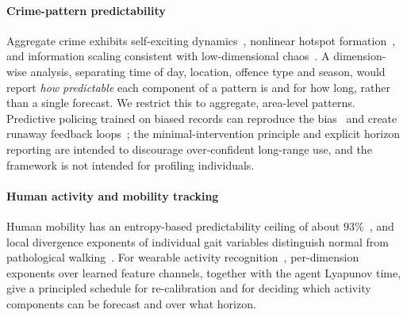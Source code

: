 \documentclass[preprint,12pt]{elsarticle}
\begin{document}
\paragraph{Crime-pattern predictability}
Aggregate crime exhibits self-exciting dynamics~\cite{mohler2011}, nonlinear hotspot formation~\cite{short2008}, and information scaling consistent with low-dimensional chaos~\cite{melgarejo2018}. A dimension-wise analysis, separating time of day, location, offence type and season, would report \emph{how predictable} each component of a pattern is and for how long, rather than a single forecast. We restrict this to aggregate, area-level patterns. Predictive policing trained on biased records can reproduce the bias~\cite{lum2016} and create runaway feedback loops~\cite{ensign2018}; the minimal-intervention principle and explicit horizon reporting are intended to discourage over-confident long-range use, and the framework is not intended for profiling individuals.

\paragraph{Human activity and mobility tracking}
Human mobility has an entropy-based predictability ceiling of about $93\%$~\cite{song2010}, and local divergence exponents of individual gait variables distinguish normal from pathological walking~\cite{dingwell2000,bruijn2013}. For wearable activity recognition~\cite{wang2019har}, per-dimension exponents over learned feature channels, together with the agent Lyapunov time, give a principled schedule for re-calibration and for deciding which activity components can be forecast and over what horizon.

\end{document}

